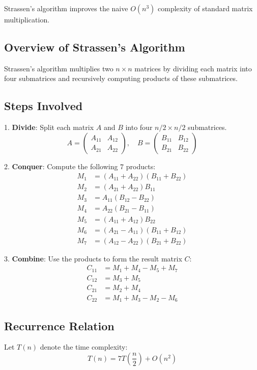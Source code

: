 \documentclass[a4paper,12pt]{report}
\begin{document}
Strassen's algorithm improves the naive \(O(n^3)\) complexity of standard matrix multiplication. 

\subsection*{Overview of Strassen's Algorithm}
Strassen's algorithm multiplies two \(n \times n\) matrices by dividing each matrix into four submatrices and recursively computing products of these submatrices. 

\subsection*{Steps Involved}
1. \textbf{Divide}: Split each matrix \(A\) and \(B\) into four \(n/2 \times n/2\) submatrices.
\[
A = \begin{pmatrix}
A_{11} & A_{12} \\
A_{21} & A_{22}
\end{pmatrix}, \quad 
B = \begin{pmatrix}
B_{11} & B_{12} \\
B_{21} & B_{22}
\end{pmatrix}
\]

2. \textbf{Conquer}: Compute the following \(7\) products:
\begin{align*}
M_1 & = (A_{11} + A_{22})(B_{11} + B_{22}) \\
M_2 & = (A_{21} + A_{22})B_{11} \\
M_3 & = A_{11}(B_{12} - B_{22}) \\
M_4 & = A_{22}(B_{21} - B_{11}) \\
M_5 & = (A_{11} + A_{12})B_{22} \\
M_6 & = (A_{21} - A_{11})(B_{11} + B_{12}) \\
M_7 & = (A_{12} - A_{22})(B_{21} + B_{22}) 
\end{align*}

3. \textbf{Combine}: Use the products to form the result matrix \(C\):
\begin{align*}
C_{11} & = M_1 + M_4 - M_5 + M_7 \\
C_{12} & = M_3 + M_5 \\
C_{21} & = M_2 + M_4 \\
C_{22} & = M_1 + M_3 - M_2 - M_6
\end{align*}

\subsection*{Recurrence Relation}
Let \(T(n)\) denote the time complexity:
\[
T(n) = 7T\left(\frac{n}{2}\right) + O(n^2)
\]
\end{document}
